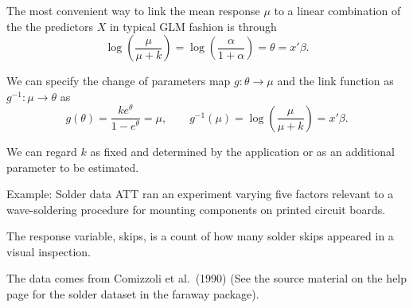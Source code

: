 \documentclass[
  ignorenonframetext,
]{beamer}
\begin{document}
\begin{frame}{}
\protect\hypertarget{section-30}{}
The most convenient way to link the mean response \(\mu\) to a linear
combination of the the predictors \(X\) in typical GLM fashion is
through \[
  \log\left(\frac{\mu}{\mu+k}\right) = \log\left(\frac{\alpha}{1+\alpha}\right) = \theta = x'\beta.
\]

\vspace{12pt}

We can specify the change of parameters map \(g:\theta\to\mu\) and the
link function as \(g^{-1}:\mu\to\theta\) as \[
  g(\theta) = \frac{ke^\theta}{1 - e^\theta} = \mu, \qquad 
    g^{-1}(\mu) = \log\left(\frac{\mu}{\mu+k}\right) = x'\beta.
\]

\vspace{12pt}

We can regard \(k\) as fixed and determined by the application or as an
additional parameter to be estimated.
\end{frame}

\begin{frame}{Example: Solder data}
\protect\hypertarget{example-solder-data}{}
ATT ran an experiment varying five factors relevant to a wave-soldering
procedure for mounting components on printed circuit boards.

\vspace{12pt}

The response variable, skips, is a count of how many solder skips
appeared in a visual inspection.

\vspace{12pt}

The data comes from Comizzoli et al.~(1990) (See the source material on
the help page for the solder dataset in the faraway package).
\end{frame}
\end{document}
